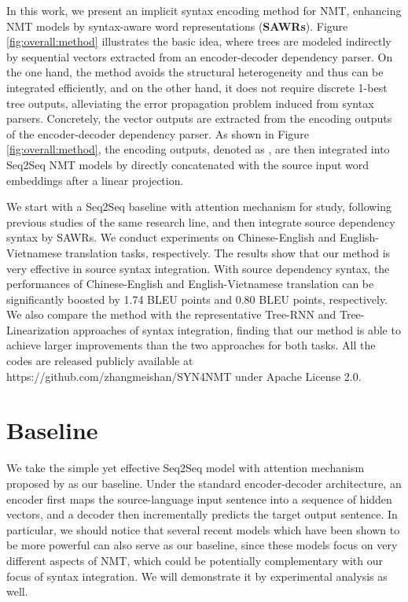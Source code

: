 \documentclass[11pt,a4paper]{article}
\begin{document}
\begin{CJK}{UTF8}{gbsn}
In this work, we present an implicit syntax encoding method for NMT,
enhancing NMT models by syntax-aware word representations (\textbf{SAWRs}).
Figure \ref{fig:overall:method} illustrates the basic idea,
where trees are modeled indirectly by sequential vectors extracted from an encoder-decoder dependency parser.
On the one hand, the method avoids the structural heterogeneity and thus can be integrated efficiently,
and on the other hand,
it does not require discrete 1-best tree outputs,
alleviating the error propagation problem induced from syntax parsers.
Concretely,
the vector outputs are extracted from the encoding outputs of the encoder-decoder dependency parser.
As shown in Figure \ref{fig:overall:method},
the encoding outputs, denoted as ,
are then integrated into Seq2Seq NMT models by directly concatenated with the source input word embeddings after a linear projection.

We start with a Seq2Seq baseline with attention mechanism \cite{bahdanau2014neural} for study,
following previous studies of the same research line,
and then integrate source dependency syntax by SAWRs.
We conduct experiments on Chinese-English and English-Vietnamese translation tasks, respectively.
The results show that our method is very effective in source syntax integration.
With source dependency syntax, the performances of Chinese-English and English-Vietnamese translation
can be significantly boosted by 1.74 BLEU points and 0.80 BLEU points, respectively.
We also compare the method with the representative Tree-RNN and Tree-Linearization approaches of syntax integration,
finding that our method is able to achieve larger improvements than the two approaches for both tasks.
All the codes are released publicly available at https://github.com/zhangmeishan/SYN4NMT under Apache License 2.0.










\section{Baseline}
We take the simple yet effective Seq2Seq model with attention mechanism proposed by  as our baseline.
Under the standard encoder-decoder architecture,
an encoder first maps the source-language input sentence into a sequence of hidden vectors, and a decoder then incrementally predicts the target output sentence. In particular, we should notice that several recent models \cite{vaswani2017attention,zheng2017modeling,yongcheng:2018:ACLMain}
which have been shown to be more powerful can also serve
as our baseline,
since these models focus on very different aspects of NMT,
which could be potentially complementary with our focus of syntax integration.
We will demonstrate it by experimental analysis as well.




\end{CJK}
\end{document}
